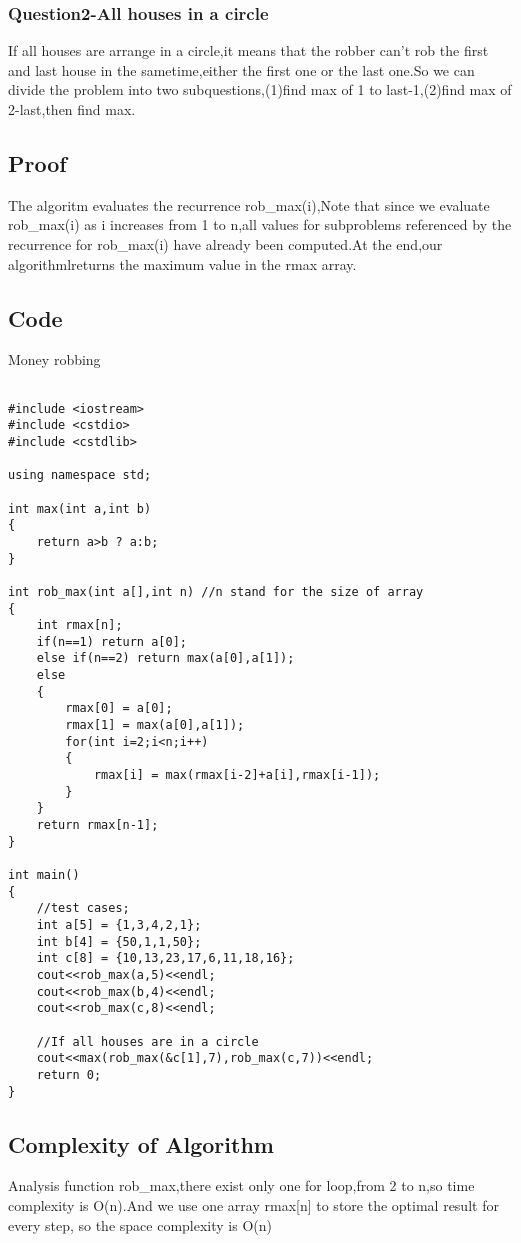 \documentclass[]{article}
\begin{document}
\subsubsection{Question2-All houses in a circle}
If all houses are arrange in a circle,it means that the robber can't rob the first and last house in the sametime,either the first one or the last one.So we can divide the problem into two subquestions,(1)find max of 1 to last-1,(2)find max of 2-last,then find max.
\subsection{Proof}
The algoritm evaluates the recurrence rob\_max(i),Note that since we evaluate rob\_max(i) as i increases from 1 to n,all values for subproblems referenced by the recurrence for rob\_max(i) have already been computed.At the end,our algorithmlreturns the maximum value in the rmax array.
\subsection{Code}

\begin{algorithm}[H]
\caption{Money robbing} \label{Dynamic Programming}
\begin{lstlisting}[]

#include <iostream>
#include <cstdio>
#include <cstdlib>

using namespace std;

int max(int a,int b)
{
	return a>b ? a:b;
}

int rob_max(int a[],int n) //n stand for the size of array
{
	int rmax[n];
	if(n==1) return a[0];
	else if(n==2) return max(a[0],a[1]);
	else
	{
		rmax[0] = a[0];
		rmax[1] = max(a[0],a[1]);
		for(int i=2;i<n;i++)
		{
			rmax[i] = max(rmax[i-2]+a[i],rmax[i-1]);
		}
	}
	return rmax[n-1];
}

int main()
{
	//test cases;
	int a[5] = {1,3,4,2,1};
	int b[4] = {50,1,1,50};
	int c[8] = {10,13,23,17,6,11,18,16};
	cout<<rob_max(a,5)<<endl;
	cout<<rob_max(b,4)<<endl;
	cout<<rob_max(c,8)<<endl;

	//If all houses are in a circle
	cout<<max(rob_max(&c[1],7),rob_max(c,7))<<endl;
	return 0;
}
\end{lstlisting}
\end{algorithm}
\subsection{Complexity of Algorithm}
Analysis function rob\_max,there exist only one for loop,from 2 to n,so time complexity is O(n).And we use one array rmax[n] to store the optimal result for every step,
so the space complexity is O(n)
\end{document}
